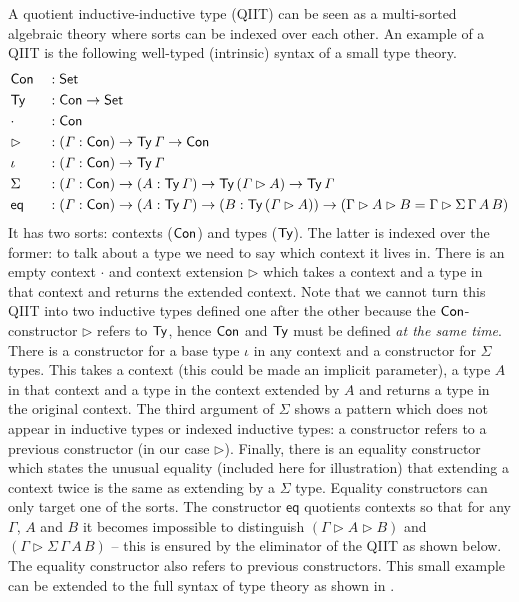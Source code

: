 \documentclass[acmsmall,review]{acmart}\settopmatter{printfolios=true,printccs=false,printacmref=false}
\begin{document}
A quotient inductive-inductive type (QIIT) can be seen as a
multi-sorted algebraic theory where sorts can be indexed over each
other. An example of a QIIT is the following well-typed (intrinsic)
syntax of a small type theory.
\begin{alignat*}{5}
  & \mathsf{Con} && : \mathsf{Set} \\
  & \mathsf{Ty} && : \mathsf{Con}\rightarrow\mathsf{Set} \\
  & \cdot && : \mathsf{Con} \\
  & \rhd && : (\mathit{\Gamma}:\mathsf{Con})\rightarrow\mathsf{Ty}\,\mathit{\Gamma}\rightarrow\mathsf{Con} \\
  & \iota && : (\mathit{\Gamma}:\mathsf{Con})\rightarrow\mathsf{Ty}\,\mathit{\Gamma} \\
  & \Sigma && : (\mathit{\Gamma}:\mathsf{Con})\rightarrow(A:\mathsf{Ty}\,\mathit{\Gamma})\rightarrow\mathsf{Ty}\,(\mathit{\Gamma}\rhd A)\rightarrow\mathsf{Ty}\,\mathit{\Gamma} \\
  & \mathsf{eq} && : (\mathit{\Gamma}:\mathsf{Con})\rightarrow(A:\mathsf{Ty}\,\mathit{\Gamma})\rightarrow(B:\mathsf{Ty}\,(\mathit{\Gamma}\rhd A))\rightarrow (\Gamma\rhd A \rhd B = \Gamma\rhd \Sigma\,\Gamma\,A\,B)
\end{alignat*}
It has two sorts: contexts ($\mathsf{Con}$) and types ($\mathsf{Ty}$). The latter is
indexed over the former: to talk about a type we need to say which
context it lives in. There is an empty context $\cdot$ and context
extension $\rhd$ which takes a context and a type in that context and
returns the extended context. Note that we cannot turn this QIIT into
two inductive types defined one after the other because the
$\mathsf{Con}$-constructor $\rhd$ refers to $\mathsf{Ty}$, hence $\mathsf{Con}$ and $\mathsf{Ty}$ must
be defined \emph{at the same time}. There is a constructor for a base
type $\iota$ in any context and a constructor for $\Sigma$ types. This
takes a context (this could be made an implicit parameter), a type $A$
in that context and a type in the context extended by $A$ and returns
a type in the original context. The third argument of $\Sigma$ shows a
pattern which does not appear in inductive types or indexed inductive
types: a constructor refers to a previous constructor (in our case
$\rhd$). Finally, there is an equality constructor which states the
unusual equality (included here for illustration) that extending a
context twice is the same as extending by a $\Sigma$ type. Equality
constructors can only target one of the sorts. The constructor
$\mathsf{eq}$ quotients contexts so that for any $\Gamma$, $A$ and $B$
it becomes impossible to distinguish $(\Gamma\rhd A \rhd B)$ and
$(\Gamma\rhd \Sigma\,\Gamma\,A\,B)$ -- this is ensured by the
eliminator of the QIIT as shown below. The equality constructor also
refers to previous constructors. This small example can be extended to
the full syntax of type theory as shown in \cite{ttintt}.
\end{document}
